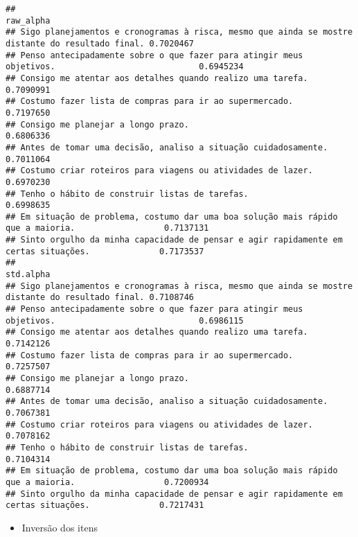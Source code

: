 \documentclass[
]{article}
\providecommand{\tightlist}{%
  \setlength{\itemsep}{0pt}\setlength{\parskip}{0pt}}
\begin{document}
\begin{verbatim}
##                                                                                                  raw_alpha
## Sigo planejamentos e cronogramas à risca, mesmo que ainda se mostre distante do resultado final. 0.7020467
## Penso antecipadamente sobre o que fazer para atingir meus objetivos.                             0.6945234
## Consigo me atentar aos detalhes quando realizo uma tarefa.                                       0.7090991
## Costumo fazer lista de compras para ir ao supermercado.                                          0.7197650
## Consigo me planejar a longo prazo.                                                               0.6806336
## Antes de tomar uma decisão, analiso a situação cuidadosamente.                                   0.7011064
## Costumo criar roteiros para viagens ou atividades de lazer.                                      0.6970230
## Tenho o hábito de construir listas de tarefas.                                                   0.6998635
## Em situação de problema, costumo dar uma boa solução mais rápido que a maioria.                  0.7137131
## Sinto orgulho da minha capacidade de pensar e agir rapidamente em certas situações.              0.7173537
##                                                                                                  std.alpha
## Sigo planejamentos e cronogramas à risca, mesmo que ainda se mostre distante do resultado final. 0.7108746
## Penso antecipadamente sobre o que fazer para atingir meus objetivos.                             0.6986115
## Consigo me atentar aos detalhes quando realizo uma tarefa.                                       0.7142126
## Costumo fazer lista de compras para ir ao supermercado.                                          0.7257507
## Consigo me planejar a longo prazo.                                                               0.6887714
## Antes de tomar uma decisão, analiso a situação cuidadosamente.                                   0.7067381
## Costumo criar roteiros para viagens ou atividades de lazer.                                      0.7078162
## Tenho o hábito de construir listas de tarefas.                                                   0.7104314
## Em situação de problema, costumo dar uma boa solução mais rápido que a maioria.                  0.7200934
## Sinto orgulho da minha capacidade de pensar e agir rapidamente em certas situações.              0.7217431
\end{verbatim}

\begin{itemize}
\tightlist
\item
  Inversão dos itens
\end{itemize}
\end{document}
